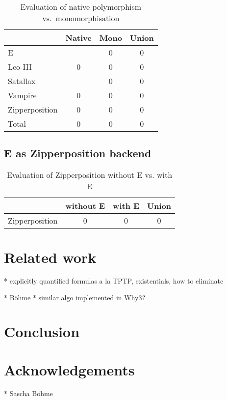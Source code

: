 \documentclass[]{ceurart}
\begin{document}
\begin{table}[ht]
\caption{Evaluation of native polymorphism vs.\ monomorphisation}
\centering\begin{tabular}{@{}lccc@{}}
   \toprule
   & Native & Mono & Union \\
   \midrule
   E  &   & 0 & 0 \\
   Leo-III & 0 & 0 & 0 \\
   Satallax &  & 0 & 0 \\
   Vampire & 0 & 0 & 0 \\
   Zipperposition & 0 & 0 & 0 \\[1.5\jot]
   Total & 0 & 0 & 0 \\
   \bottomrule
\end{tabular}
\end{table}

\subsection{E as Zipperposition backend}

\begin{table}[ht]
\caption{Evaluation of Zipperposition without E vs. with E}
\centering\begin{tabular}{@{}lccc@{}}
   \toprule
   & without E & with E & Union \\
   \midrule
   Zipperposition & 0 & 0 & 0 \\
   \bottomrule
\end{tabular}
\end{table}

\break

\section{Related work}
\label{sec:related-work}

  * explicitly quantified formulas a la TPTP, existentials, how to eliminate

  * Böhme
  * similar algo implemented in Why3?

\section{Conclusion}
\label{sec:conclusion}



\section*{Acknowledgements}

* Sascha Böhme


\end{document}
